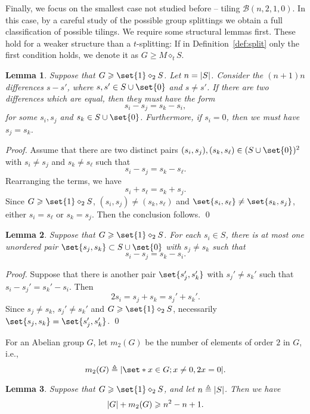 \documentclass[sort&compress]{elsarticle}
\DeclarePairedDelimiter\abs{\lvert}{\rvert}
\newcommand{\cB}{\mathcal{B}}
\renewcommand{\geq}{\geqslant}
\newtheorem{lemma}{Lemma}
\newcommand{\eqdef}{\triangleq}
\newcommand{\splt}{\diamond}
\begin{document}
  Finally, we focus on the smallest case not studied before -- tiling
  $\cB(n,2,1,0)$. In this case, by a careful study of the possible
  group splittings we obtain a full classification of possible
  tilings. We require some structural lemmas first. These hold for a
  weaker structure than a $t$-splitting: If in
  Definition~\ref{def:split} only the first condition holds, we denote
  it as $G\geq M\splt_t S$.

  \begin{lemma}\label{lm:t=2-difference1}
    Suppose that $G\geq \set{1} \splt_2 S$. Let $n=\abs{S}$. Consider
    the $(n+1)n$ differences $s-s'$, where $s,s' \in S \cup \set{0}$
    and $s\neq s'$. If there are two differences which are equal, then
    they must have the form
    \[s_i-s_j=s_k-s_i,\]
    for some $s_i,s_j$ and $s_k \in S\cup \set{0}$.  Furthermore, if
    $s_i=0$, then we must have $s_j=s_k$.
  \end{lemma}

  \begin{proof}
    Assume that there are two distinct pairs $(s_i,s_j), (s_k,s_\ell)
    \in (S\cup\set{0})^2$ with $s_i\neq s_j$ and $s_k\neq s_\ell$ such
    that
    \[s_i-s_j=s_k-s_\ell.\]
    Rearranging the terms, we have 
    \[s_i+s_\ell=s_k+s_j.\]
    Since $G\geq \set{1} \splt_2 S$, $(s_i,s_j)\neq (s_k,s_\ell)$ and
    $\set{s_i,s_\ell}\neq \set{s_k,s_j}$, either $s_i=s_\ell$ or
    $s_k=s_j$. Then the conclusion follows.
  \qed\end{proof}

  \begin{lemma}\label{lm:t=2-difference2}
    Suppose that $G\geq \set{1} \splt_2 S$. For each $s_i \in S$,
    there is at most one unordered  pair $\set{s_j,s_k} \subset S\cup\set{0}$
    with $s_j\neq s_k$ such that
    \[s_i-s_j=s_k-s_i.\]
  \end{lemma}

  \begin{proof}
    Suppose that there is another pair $\set{s_j',s_k'}$ with
    $s_j'\neq s_k'$ such that $s_i-s_j'=s_k'-s_i$. Then
    \[2s_i=s_j+s_k=s_j'+s_k'.\]
    Since $s_j\neq s_k$, $s_j'\neq s_k'$ and $G\geq \set{1} \splt_2
    S$, necessarily $\set{s_j,s_k}=\set{s_j',s_k'}$.
  \qed\end{proof}

  For an Abelian group $G$, let $m_2(G)$ be the number of elements of
  order $2$ in $G$, i.e.,
  \[m_2(G)\eqdef  \abs*{\set*{x\in G ; x\neq 0, 2x=0}}.\]

  \begin{lemma}\label{lem:order2}
    Suppose that $G\geq \set{1} \splt_2 S$, and let
    $n\eqdef\abs{S}$. Then we have
    \[ \abs{G}+m_2(G)\geq n^2 -n+1.\]
  \end{lemma}
\end{document}
